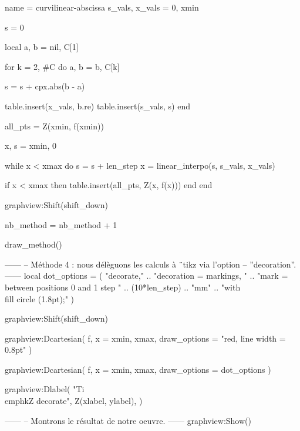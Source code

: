 \documentclass[border = 3pt]{standalone}
\begin{document}
\begin{luadraw*}{name = curvilinear-abscissa}
s_vals, x_vals = {0}, {xmin}

s = 0

local a, b = nil, C[1]

for k = 2, #C do
  a, b = b, C[k]

  s = s + cpx.abs(b - a)

  table.insert(x_vals, b.re)
  table.insert(s_vals, s)
end

all_pts = {Z(xmin, f(xmin))}

x, s = xmin, 0

while x < xmax do
  s = s + len_step
  x = linear_interpo(s, s_vals, x_vals)

  if x < xmax then
    table.insert(all_pts, Z(x, f(x)))
  end
end

graphview:Shift(shift_down)

nb_method = nb_method + 1

draw_method()


------
-- Méthode 4 : nous délèguons les calculs à ¨tikz via l'option
-- ''decoration''.
------
local dot_options = (
     "decorate,"
  .. "decoration = {markings, "
  .. "mark = between positions 0 and 1 step "
  .. (10*len_step) .. "mm"
  .. "with {\\fill circle (1.8pt);}}"
)

graphview:Shift(shift_down)

graphview:Dcartesian(
  f,
  {
    x = {xmin, xmax},
    draw_options = "red, line width = 0.8pt"
  }
)

graphview:Dcartesian(
  f,
  {
    x = {xmin, xmax},
    draw_options = dot_options
  }
)

graphview:Dlabel(
  "Ti\\emph{k}Z decorate", Z(xlabel, ylabel),
  {}
)

------
-- Montrons le résultat de notre oeuvre.
------
graphview:Show()
\end{luadraw*}
\end{document}
